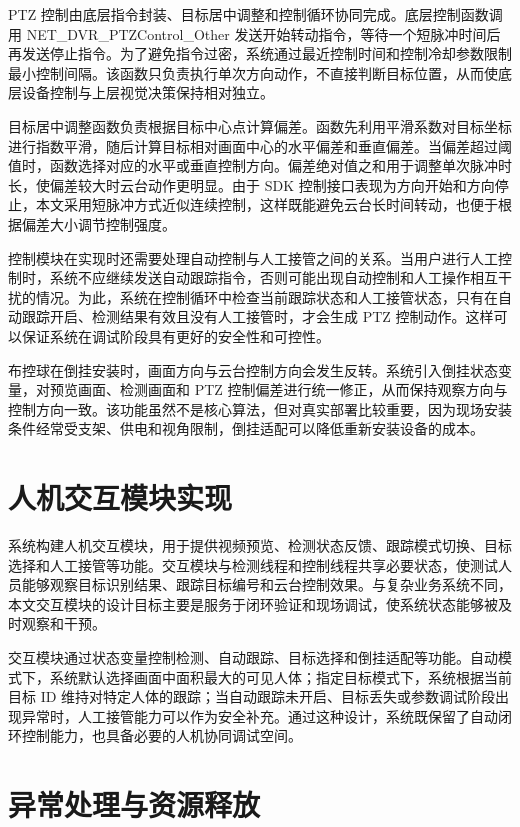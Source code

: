 PTZ 控制由底层指令封装、目标居中调整和控制循环协同完成。底层控制函数调用 NET\_DVR\_PTZControl\_Other 发送开始转动指令，等待一个短脉冲时间后再发送停止指令。为了避免指令过密，系统通过最近控制时间和控制冷却参数限制最小控制间隔。该函数只负责执行单次方向动作，不直接判断目标位置，从而使底层设备控制与上层视觉决策保持相对独立。

目标居中调整函数负责根据目标中心点计算偏差。函数先利用平滑系数对目标坐标进行指数平滑，随后计算目标相对画面中心的水平偏差和垂直偏差。当偏差超过阈值时，函数选择对应的水平或垂直控制方向。偏差绝对值之和用于调整单次脉冲时长，使偏差较大时云台动作更明显。由于 SDK 控制接口表现为方向开始和方向停止，本文采用短脉冲方式近似连续控制，这样既能避免云台长时间转动，也便于根据偏差大小调节控制强度。

控制模块在实现时还需要处理自动控制与人工接管之间的关系。当用户进行人工控制时，系统不应继续发送自动跟踪指令，否则可能出现自动控制和人工操作相互干扰的情况。为此，系统在控制循环中检查当前跟踪状态和人工接管状态，只有在自动跟踪开启、检测结果有效且没有人工接管时，才会生成 PTZ 控制动作。这样可以保证系统在调试阶段具有更好的安全性和可控性。

布控球在倒挂安装时，画面方向与云台控制方向会发生反转。系统引入倒挂状态变量，对预览画面、检测画面和 PTZ 控制偏差进行统一修正，从而保持观察方向与控制方向一致。该功能虽然不是核心算法，但对真实部署比较重要，因为现场安装条件经常受支架、供电和视角限制，倒挂适配可以降低重新安装设备的成本。

\section{人机交互模块实现}

系统构建人机交互模块，用于提供视频预览、检测状态反馈、跟踪模式切换、目标选择和人工接管等功能。交互模块与检测线程和控制线程共享必要状态，使测试人员能够观察目标识别结果、跟踪目标编号和云台控制效果。与复杂业务系统不同，本文交互模块的设计目标主要是服务于闭环验证和现场调试，使系统状态能够被及时观察和干预。

交互模块通过状态变量控制检测、自动跟踪、目标选择和倒挂适配等功能。自动模式下，系统默认选择画面中面积最大的可见人体；指定目标模式下，系统根据当前目标 ID 维持对特定人体的跟踪；当自动跟踪未开启、目标丢失或参数调试阶段出现异常时，人工接管能力可以作为安全补充。通过这种设计，系统既保留了自动闭环控制能力，也具备必要的人机协同调试空间。

\section{异常处理与资源释放}

